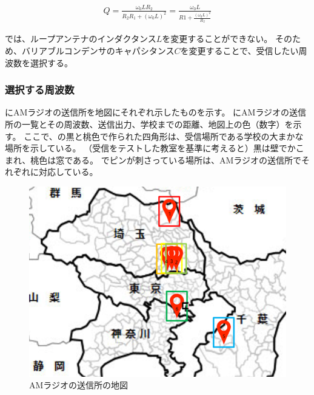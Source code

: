 \documentclass[report.tex]{subfiles}
\begin{document}
\begin{align}
	Q = \frac{\omega_0 L R_2}{R_2R_1 + (\omega_0 L)^2} = \frac{\omega_0 L}{R1 + \frac{(\omega_0 L)^2}{R_2}} \label{eq:Q値2}
\end{align}

では、ループアンテナのインダクタンス\(L\)を変更することができない。
そのため、バリアブルコンデンサのキャパシタンス\(C\)を変更することで、受信したい周波数を選択する。

\subsubsection{選択する周波数}

にAMラジオの送信所を地図にそれぞれ示したものを示す。
にAMラジオの送信所の一覧とその周波数、送信出力、学校までの距離、地図上の色（数字）を示す。
ここで、の黒と桃色で作られた四角形は、受信場所である学校の大まかな場所を示している。
（受信をテストした教室を基準に考えると）黒は壁でかこまれ、桃色は窓である。
でピンが刺さっている場所は、AMラジオの送信所でそれぞれに対応している。

\begin{figure}[H]
	\centering
	\includegraphics[width=15cm]{use/map.png}
	\caption{AMラジオの送信所の地図}
	\label{fig:map}
\end{figure}
\end{document}
